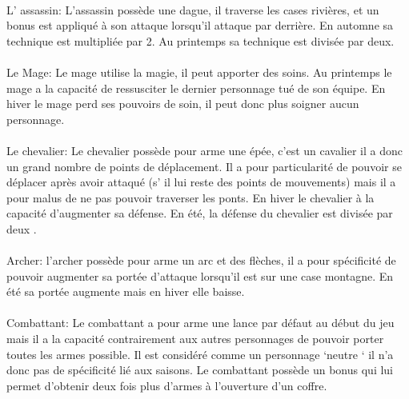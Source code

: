 \documentclass[a4paper,12pt]{article}
\begin{document}
\paragraph{}
L' assassin: L'assassin possède une dague, il traverse les cases rivières, et un bonus est appliqué à son attaque lorsqu'il attaque par derrière. En automne sa technique est multipliée par 2. Au printemps sa technique est divisée par deux.
\paragraph{}
Le Mage: Le mage utilise la magie, il peut apporter des soins.
Au printemps le mage a la capacité de ressusciter le dernier personnage tué de son équipe. En hiver le mage perd ses pouvoirs de soin, il peut donc plus soigner aucun personnage.
\paragraph{}
Le chevalier: Le chevalier possède pour arme une épée, c'est un cavalier il a donc un grand nombre de points de déplacement. Il a pour particularité de pouvoir se déplacer après avoir attaqué (s' il lui reste des points de mouvements) mais il a pour malus de ne pas pouvoir traverser les ponts. En hiver le chevalier à la capacité d’augmenter sa défense. En été, la défense du chevalier est divisée par deux .
\paragraph{}
Archer: l’archer possède pour arme un arc et des flèches, il a pour spécificité de pouvoir augmenter sa portée d'attaque lorsqu'il est sur une case montagne.
En été sa portée augmente mais en hiver elle baisse.  
\paragraph{}
Combattant: Le combattant  a pour arme une lance par défaut au début du jeu mais il a la capacité contrairement aux autres personnages de pouvoir porter toutes les armes possible.  Il est considéré comme un personnage ‘neutre ‘ il n’a donc pas de spécificité lié aux saisons.
Le combattant possède un bonus qui lui permet d’obtenir deux fois plus d’armes à l’ouverture d’un coffre.
\end{document}
